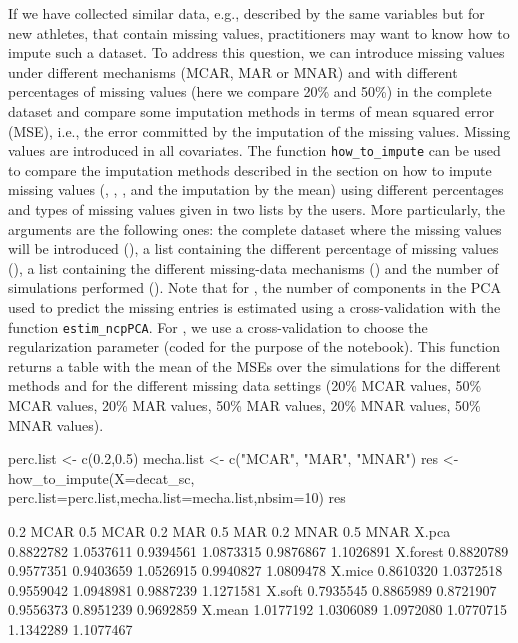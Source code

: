 \begin{appendix}
If we have collected similar data, e.g., described by the same variables but for new athletes, that contain missing values, practitioners may want to know how to impute such a dataset. To address this question, we can introduce missing values under different mechanisms (MCAR, MAR or MNAR) and with different percentages of missing values (here we compare 20\% and 50\%) in the complete dataset and compare some imputation methods in terms of mean squared error (MSE), i.e., the error committed by the imputation of the missing values. Missing values are introduced in all covariates. The function \texttt{how\_to\_impute} can be used to compare the imputation methods described in the section on how to impute missing values (, , ,  and the imputation by the mean) using different percentages and types of missing values given in two lists by the users. More particularly, the arguments are the following ones: the complete dataset where the missing values will be introduced (), a list containing the different percentage of missing values (), a list containing the different missing-data mechanisms () and the number of simulations performed (). 
Note that for , the number of components in the PCA used to predict the missing entries is estimated using a cross-validation with the function \texttt{estim\_ncpPCA}. For , we use a cross-validation to choose the regularization parameter (coded for the purpose of the notebook).
This function returns a table with the mean of the MSEs over the simulations for the different methods and for the different missing data settings (20\% MCAR values, 50\% MCAR values, 20\% MAR values, 50\% MAR values, 20\% MNAR values, 50\% MNAR values).

\begin{example}
perc.list <- c(0.2,0.5)
mecha.list <- c("MCAR", "MAR", "MNAR")
res <- how_to_impute(X=decat_sc, perc.list=perc.list,mecha.list=mecha.list,nbsim=10)
res

          0.2 MCAR  0.5 MCAR   0.2 MAR   0.5 MAR  0.2 MNAR  0.5 MNAR
X.pca    0.8822782 1.0537611 0.9394561 1.0873315 0.9876867 1.1026891
X.forest 0.8820789 0.9577351 0.9403659 1.0526915 0.9940827 1.0809478
X.mice   0.8610320 1.0372518 0.9559042 1.0948981 0.9887239 1.1271581
X.soft   0.7935545 0.8865989 0.8721907 0.9556373 0.8951239 0.9692859
X.mean   1.0177192 1.0306089 1.0972080 1.0770715 1.1342289 1.1077467
\end{example}


\end{appendix}
